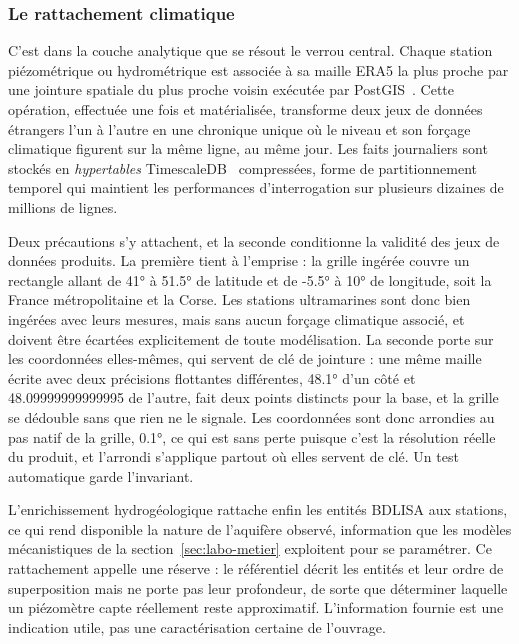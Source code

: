 \subsubsection{Le rattachement climatique}

C'est dans la couche analytique que se résout le verrou central. Chaque station piézométrique ou hydrométrique est associée à sa maille ERA5 la plus proche par une jointure spatiale du plus proche voisin exécutée par PostGIS~\cite{postgis}. Cette opération, effectuée une fois et matérialisée, transforme deux jeux de données étrangers l'un à l'autre en une chronique unique où le niveau et son forçage climatique figurent sur la même ligne, au même jour. Les faits journaliers sont stockés en \emph{hypertables} TimescaleDB~\cite{timescaledb} compressées, forme de partitionnement temporel qui maintient les performances d'interrogation sur plusieurs dizaines de millions de lignes.

Deux précautions s'y attachent, et la seconde conditionne la validité des jeux de données produits. La première tient à l'emprise : la grille ingérée couvre un rectangle allant de \ang{41} à \ang{51.5} de latitude et de \ang{-5.5} à \ang{10} de longitude, soit la France métropolitaine et la Corse. Les stations ultramarines sont donc bien ingérées avec leurs mesures, mais sans aucun forçage climatique associé, et doivent être écartées explicitement de toute modélisation. La seconde porte sur les coordonnées elles-mêmes, qui servent de clé de jointure : une même maille écrite avec deux précisions flottantes différentes, \ang{48.1} d'un côté et \num{48.09999999999995} de l'autre, fait deux points distincts pour la base, et la grille se dédouble sans que rien ne le signale. Les coordonnées sont donc arrondies au pas natif de la grille, \ang{0.1}, ce qui est sans perte puisque c'est la résolution réelle du produit, et l'arrondi s'applique partout où elles servent de clé. Un test automatique garde l'invariant.

L'enrichissement hydrogéologique rattache enfin les entités BDLISA aux stations, ce qui rend disponible la nature de l'aquifère observé, information que les modèles mécanistiques de la section~\ref{sec:labo-metier} exploitent pour se paramétrer. Ce rattachement appelle une réserve : le référentiel décrit les entités et leur ordre de superposition mais ne porte pas leur profondeur, de sorte que déterminer laquelle un piézomètre capte réellement reste approximatif. L'information fournie est une indication utile, pas une caractérisation certaine de l'ouvrage.

